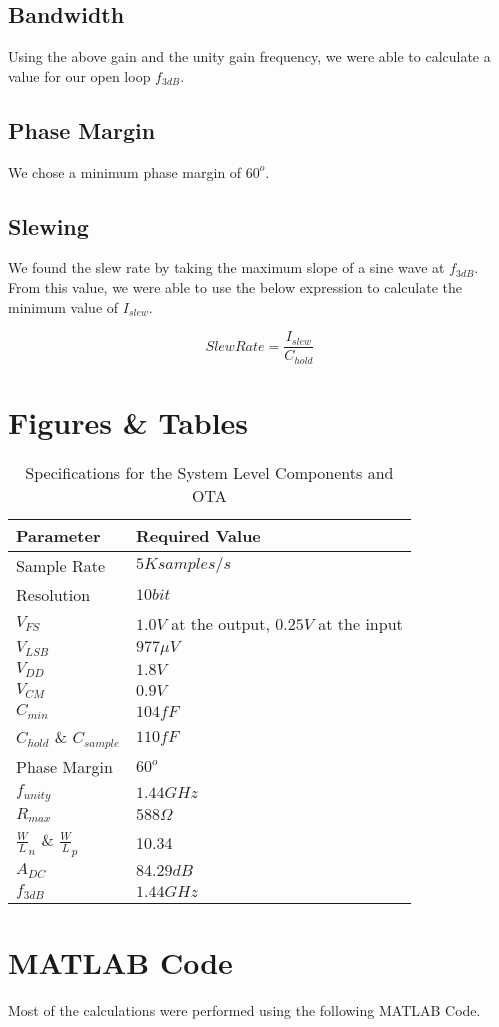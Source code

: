 \documentclass{article}
\begin{document}
\subsection{Bandwidth}
Using the above gain and the unity gain frequency, we were able to calculate a value for our open loop $f_{3dB}$.

\subsection{Phase Margin}
We chose a minimum phase margin of $60^o$.

\subsection{Slewing}
We found the slew rate by taking the maximum slope of a sine wave at $f_{3dB}$. From this value, we were able to use the below expression to calculate the minimum value of $I_{slew}$.

\begin{equation}
Slew Rate = \frac{I_{slew}}{C_{hold}}
\end{equation}

\section{Figures \& Tables}

\begin{table}[h]
\centering
{}
\begin{tabularx}{500pt}{|R|R|}
\hline
\textbf{Parameter}&\textbf{Required Value}\\ \hline
Sample Rate&$5K samples/s$\\ \hline
Resolution&$10bit$\\ \hline
$V_{FS}$&$1.0V$ at the output, $0.25V$ at the input\\ \hline
$V_{LSB}$&$977\mu V$\\ \hline
$V_{DD}$&$1.8V$\\ \hline
$V_{CM}$&$0.9V$\\ \hline
$C_{min}$&$104fF$\\ \hline
$C_{hold}$ \& $C_{sample}$&$110fF$\\ \hline
Phase Margin&$60^o$\\ \hline
$f_{unity}$&$1.44GHz$\\ \hline
$R_{max}$&$588 \Omega$\\ \hline
$\frac{W}{L}_n$ \& $\frac{W}{L}_p$&10.34\\ \hline
$A_{DC}$&$84.29dB$\\ \hline
$f_{3dB}$&$1.44GHz$\\ \hline
\end{tabularx}
\caption{Specifications for the System Level Components and OTA}
\label{specs}
\end{table}

\clearpage
\section{MATLAB Code}
Most of the calculations were performed using the following MATLAB Code.

\end{document}
